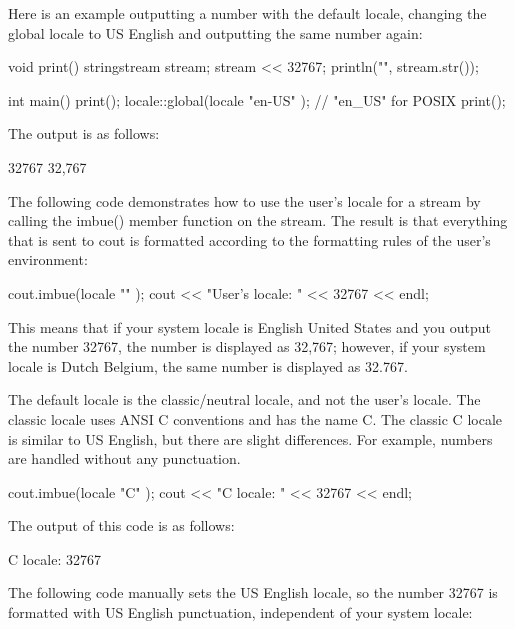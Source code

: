 Here is an example outputting a number with the default locale, changing the global locale to US English and outputting the same number again:

\begin{cpp}
void print()
{
    stringstream stream;
    stream << 32767;
    println("{}", stream.str());
}

int main()
{
    print();
    locale::global(locale { "en-US" }); // "en_US" for POSIX
    print();
}
\end{cpp}

The output is as follows:

\begin{shell}
32767
32,767
\end{shell}


The following code demonstrates how to use the user’s locale for a stream by calling the imbue() member function on the stream. The result is that everything that is sent to cout is formatted according to the formatting rules of the user’s environment:

\begin{cpp}
cout.imbue(locale { "" });
cout << "User's locale: " << 32767 << endl;
\end{cpp}

This means that if your system locale is English United States and you output the number 32767, the number is displayed as 32,767; however, if your system locale is Dutch Belgium, the same number is displayed as 32.767.

The default locale is the classic/neutral locale, and not the user’s locale. The classic locale uses ANSI C conventions and has the name C. The classic C locale is similar to US English, but there are slight differences. For example, numbers are handled without any punctuation.

\begin{cpp}
cout.imbue(locale { "C" });
cout << "C locale: " << 32767 << endl;
\end{cpp}

The output of this code is as follows:

\begin{shell}
C locale: 32767
\end{shell}

The following code manually sets the US English locale, so the number 32767 is formatted with US English punctuation, independent of your system locale:

